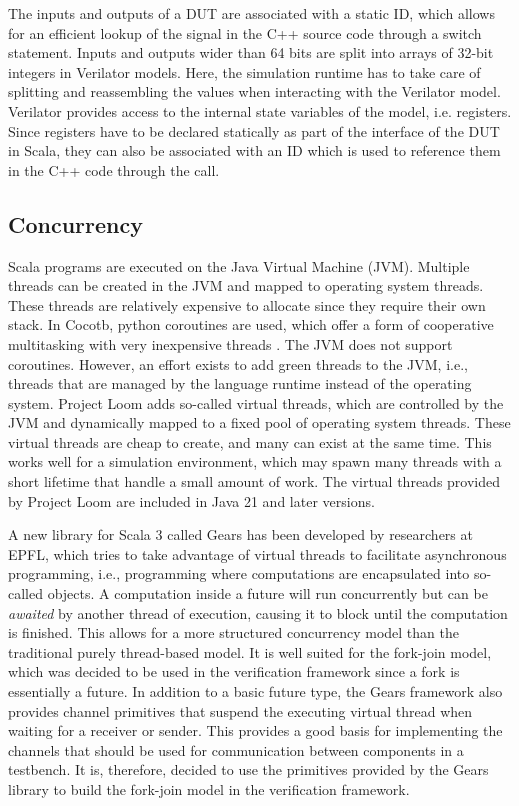 The inputs and outputs of a DUT are associated with a static ID, which allows for an efficient lookup of the signal in the C++ source code through a switch statement. Inputs and outputs wider than 64 bits are split into arrays of 32-bit integers in Verilator models. Here, the simulation runtime has to take care of splitting and reassembling the values when interacting with the Verilator model. Verilator provides access to the internal state variables of the model, i.e. registers. Since registers have to be declared statically as part of the interface of the DUT in Scala, they can also be associated with an ID which is used to reference them in the C++ code through the  call.


\subsection{Concurrency} %

Scala programs are executed on the Java Virtual Machine (JVM). Multiple threads can be created in the JVM and
mapped to operating system threads. These threads are relatively expensive to allocate since they require their own stack. In Cocotb, python coroutines are used, which offer a form of cooperative multitasking with very inexpensive
threads \cite{pycoroutines}. The JVM does not support coroutines. However, an effort exists to add green threads to
the JVM, i.e., threads that are managed by the language runtime instead of the operating system. Project Loom
\cite{loom} adds so-called virtual threads, which are controlled by the JVM and dynamically mapped to a fixed pool of
operating system threads. These virtual threads are cheap to create, and many can exist at the same time. This works
well for a simulation environment, which may spawn many threads with a short lifetime that handle a small amount of
work. The virtual threads provided by Project Loom are included in Java 21 and later versions.

A new library for Scala 3 called Gears \cite{gears} has been developed by researchers at EPFL, which tries to take
advantage of virtual threads to facilitate asynchronous programming, i.e., programming where computations are
encapsulated into so-called  objects. A computation inside a future will run concurrently but can be
\textit{awaited} by another thread of execution, causing it to block until the computation is finished. This allows
for a more structured concurrency model than the traditional purely thread-based model. It is well suited for the
fork-join model, which was decided to be used in the verification framework since a fork is essentially a future. In
addition to a basic future type, the Gears framework also provides channel primitives that suspend the executing
virtual thread when waiting for a receiver or sender. This provides a good basis for implementing the channels that
should be used for communication between components in a testbench. It is, therefore, decided to use the primitives
provided by the Gears library to build the fork-join model in the verification framework.


